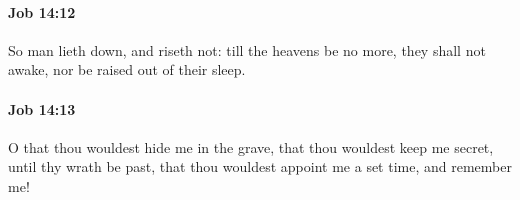 		\paragraph{Job 14:12} %
			\label{JOB-14-12}

			So man lieth down, and riseth not: till the heavens be no more, they shall not awake, nor be raised out of their sleep.


		\paragraph{Job 14:13} %
			\label{JOB-14-13}

			O that thou wouldest hide me in the grave, that thou wouldest keep me secret, until thy wrath be past, that thou wouldest appoint me a set time, and remember me!



